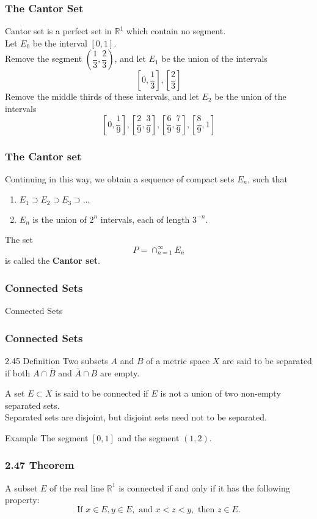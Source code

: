 \documentclass{beamer}
\begin{document}
\begin{frame}
    \frametitle{The Cantor Set}

    Cantor set is a perfect set in \(\mathbb{R}^1\) which contain no segment. \\ \pause 
    \vspace{0.2in}
    Let \(E_0\) be the interval \([0,1]\). \\ \pause
    \vspace{0.2in}
    Remove the segment \(\left(\dfrac{1}{3}, \dfrac{2}{3}\right)\), and let \(E_1\) be the union of the intervals \[\left[0, \dfrac{1}{3}\right], \left[\dfrac{2}{3}\right]\]\pause
    Remove the middle thirds of these intervals, and let \(E_2\) be the union of the intervals \[\left[0, \dfrac{1}{9}\right], \left[\dfrac{2}{9}, \dfrac{3}{9}\right],\left[\dfrac{6}{9}, \dfrac{7}{9}\right],\left[\dfrac{8}{9}, 1\right]\]


\end{frame}

\begin{frame}
    \frametitle{The Cantor set}

    Continuing in this way, we obtain a sequence of compact sets \(E_n\), such that \begin{enumerate}
        \item \(E_1 \supset E_2 \supset E_3 \supset \dots\)
        \item \(E_n\) is the union of \(2^n\) intervals, each of length \(3^{-n}\).
    \end{enumerate}
The set \[P = \cap_{n=1}^\infty E_n\] is called the \textbf{Cantor set}.
\end{frame}

\begin{frame}
    \frametitle{Connected Sets}

    \Huge{Connected Sets}

\end{frame}

\begin{frame}
    \frametitle{Connected Sets}

    \begin{block}{2.45 Definition}
        Two subsets \(A\) and \(B\) of a metric space \(X\) are said to be separated if both \(A \cap \overline{B}\) and \(\overline{A}\cap B\) are empty.  
    \end{block}\pause
\vspace{0.2in}
    A set \(E \subset X\) is said to be connected if \(E\) is not a union of two non-empty separated sets. \\ \pause
\vspace{0.2in}
Separated sets are disjoint, but disjoint sets need not to be separated. \\ \pause
\begin{block}{Example}
   The segment \([0,1]\) and the segment \((1,2)\). 
\end{block}



\end{frame}

\begin{frame}
    \frametitle{2.47 Theorem}

    A subset \(E\) of the real line \(\mathbb{R}^1\) is connected if and only if it has the following property: \[ \text{If } x \in E, y \in E, \text{ and }x<z<y, \text{ then }z\in E. \]

\end{frame}
\end{document}
